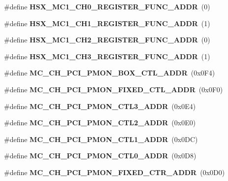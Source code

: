 \begin{DoxyCompactItemize}
\item 
\#define {\bfseries H\+S\+X\+\_\+\+M\+C1\+\_\+\+C\+H0\+\_\+\+R\+E\+G\+I\+S\+T\+E\+R\+\_\+\+F\+U\+N\+C\+\_\+\+A\+D\+DR}~(0)\label{types_8h_a9e00a2ce3e8556188d647e194d81a060}

\item 
\#define {\bfseries H\+S\+X\+\_\+\+M\+C1\+\_\+\+C\+H1\+\_\+\+R\+E\+G\+I\+S\+T\+E\+R\+\_\+\+F\+U\+N\+C\+\_\+\+A\+D\+DR}~(1)\label{types_8h_aee9cd6ca3ced8a3c153636089964b1c4}

\item 
\#define {\bfseries H\+S\+X\+\_\+\+M\+C1\+\_\+\+C\+H2\+\_\+\+R\+E\+G\+I\+S\+T\+E\+R\+\_\+\+F\+U\+N\+C\+\_\+\+A\+D\+DR}~(0)\label{types_8h_a632f2964790894881ba99d35b115a597}

\item 
\#define {\bfseries H\+S\+X\+\_\+\+M\+C1\+\_\+\+C\+H3\+\_\+\+R\+E\+G\+I\+S\+T\+E\+R\+\_\+\+F\+U\+N\+C\+\_\+\+A\+D\+DR}~(1)\label{types_8h_a55266623de7c9f6adf4ad9a97f7412a6}

\item 
\#define {\bfseries M\+C\+\_\+\+C\+H\+\_\+\+P\+C\+I\+\_\+\+P\+M\+O\+N\+\_\+\+B\+O\+X\+\_\+\+C\+T\+L\+\_\+\+A\+D\+DR}~(0x0\+F4)\label{types_8h_aea8596ef216183dc024d55d149b0cdb8}

\item 
\#define {\bfseries M\+C\+\_\+\+C\+H\+\_\+\+P\+C\+I\+\_\+\+P\+M\+O\+N\+\_\+\+F\+I\+X\+E\+D\+\_\+\+C\+T\+L\+\_\+\+A\+D\+DR}~(0x0\+F0)\label{types_8h_ac2bc96a812f71daf9b6eccaa96c8e0f3}

\item 
\#define {\bfseries M\+C\+\_\+\+C\+H\+\_\+\+P\+C\+I\+\_\+\+P\+M\+O\+N\+\_\+\+C\+T\+L3\+\_\+\+A\+D\+DR}~(0x0\+E4)\label{types_8h_ad8114150630d7b263604680573973e19}

\item 
\#define {\bfseries M\+C\+\_\+\+C\+H\+\_\+\+P\+C\+I\+\_\+\+P\+M\+O\+N\+\_\+\+C\+T\+L2\+\_\+\+A\+D\+DR}~(0x0\+E0)\label{types_8h_a34160d3d7833e5085905fac476b7b3d7}

\item 
\#define {\bfseries M\+C\+\_\+\+C\+H\+\_\+\+P\+C\+I\+\_\+\+P\+M\+O\+N\+\_\+\+C\+T\+L1\+\_\+\+A\+D\+DR}~(0x0\+D\+C)\label{types_8h_ae59d81ac1c32f8eb29851c22db9f15ba}

\item 
\#define {\bfseries M\+C\+\_\+\+C\+H\+\_\+\+P\+C\+I\+\_\+\+P\+M\+O\+N\+\_\+\+C\+T\+L0\+\_\+\+A\+D\+DR}~(0x0\+D8)\label{types_8h_ada8a1223bd0e2186680368008ab38bf9}

\item 
\#define {\bfseries M\+C\+\_\+\+C\+H\+\_\+\+P\+C\+I\+\_\+\+P\+M\+O\+N\+\_\+\+F\+I\+X\+E\+D\+\_\+\+C\+T\+R\+\_\+\+A\+D\+DR}~(0x0\+D0)\label{types_8h_a36010efef77b77099bda236928350765}


\end{DoxyCompactItemize}
